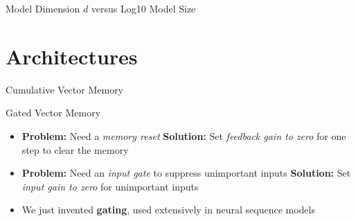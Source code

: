 \begin{slide}[\slideopts,toc={Model Dimension}]


  
\end{slide}

\begin{slidewhite}[\slideopts,toc={}]{Model Dimension $d$ versus Log10 Model Size}

\vspace{-2em}

  
\end{slidewhite}


\section[\sectopts,toc={Architectures}]{Architectures}

\begin{slide}[\slideopts,toc={Vector Memory}]{Cumulative Vector Memory}
\vspace{-1em}
\vspace{-1em}
\end{slide}

\begin{slide}[\slideopts,toc={Gating}]{Gated Vector Memory}


\begin{itemize}
\item \textbf{Problem:} Need a \emph{memory reset}
\mpitem \textbf{Solution:} Set \emph{feedback gain to zero} for one step to clear the memory
\item[]
\mpitem \textbf{Problem:} Need an \emph{input gate} to suppress unimportant inputs
\mpitem \textbf{Solution:} Set \emph{input gain to zero} for unimportant inputs
\item[]
\mpitem We just invented \textbf{gating}, used extensively in neural sequence models
\end{itemize}

\end{slide}

